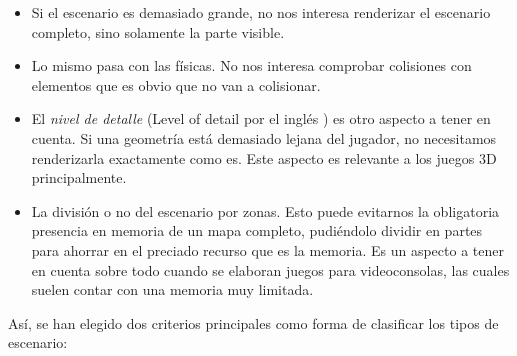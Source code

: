 \begin{itemize}
	\item Si el escenario es demasiado grande, no nos interesa renderizar el escenario completo, sino solamente la parte visible.
	\item Lo mismo pasa con las físicas. No nos interesa comprobar colisiones con elementos que es obvio que no van a colisionar.
	\item El \emph{nivel de detalle} (Level of detail por el inglés \cite{lod}) es otro aspecto a tener en cuenta. Si una geometría está demasiado lejana del jugador, no necesitamos renderizarla exactamente como es. Este aspecto es relevante a los juegos 3D principalmente.
	\item La división o no del escenario por zonas. Esto puede evitarnos la obligatoria presencia en memoria de un mapa completo, pudiéndolo dividir en partes para ahorrar en el preciado recurso que es la memoria. Es un aspecto a tener en cuenta sobre todo cuando se elaboran juegos para videoconsolas, las cuales suelen contar con una memoria muy limitada.
\end{itemize}

Así, se han elegido dos criterios principales como forma de clasificar los tipos de escenario:

